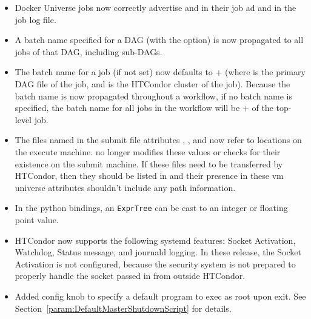 \begin{itemize}
\item Docker Universe jobs now correctly advertise 
and  in their job ad and in the job log file.

\item A batch name specified for a DAG (with the 
 option) is now propagated to all jobs of that DAG,
including sub-DAGs.

\item The batch name for a  job (if not set) now
defaults to + (where 
is the primary DAG file of the  job, and 
is the HTCondor cluster of the  job).
Because the batch name is now propagated throughout a workflow, if
no batch name is specified, the batch name for all jobs in the
workflow will be + of the top-level
 job.

\item The files named in the submit file attributes ,
, and  now refer to
locations on the execute machine.
 no longer modifies these values or checks for their
existence on the submit machine.
If these files need to be transferred by HTCondor, then they should be
listed in  and their presence in
these vm universe attributes shouldn't include any path information.

\item In the python bindings, an \texttt{ExprTree} can be cast to an integer
or floating point value.

\item HTCondor now supports the following systemd features: Socket Activation,
Watchdog, Status message, and journald logging. In these release, the
Socket Activation is not configured, because the security system is not
prepared to properly handle the socket passed in from outside HTCondor.

\item Added config knob  to
specify a default program to exec as root upon  exit.
See Section~\ref{param:DefaultMasterShutdownScript} for details.

\end{itemize}

